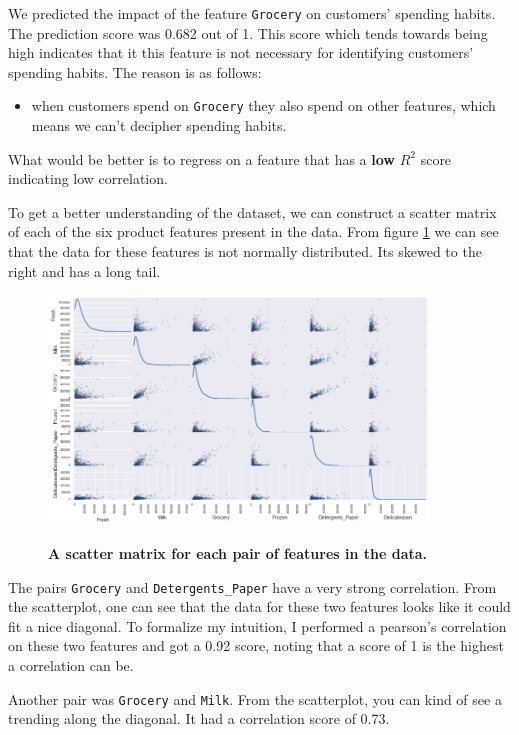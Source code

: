 \documentclass[twoside,openright,titlepage,numbers=noenddot,headinclude,%
               footinclude=true,cleardoublepage=empty,abstractoff,BCOR=5mm,%
               paper=a4,fontsize=11pt,ngerman,american]{scrreprt}
\numberwithin{theorem}{chapter}
\numberwithin{definition}{chapter}
\numberwithin{algorithm}{chapter}
\numberwithin{figure}{chapter}
\numberwithin{table}{chapter}
\numberwithin{equation}{chapter}
\begin{document}
We predicted the impact of the feature \texttt{Grocery} on customers' spending habits. The prediction score was 0.682 out of 1. This score which tends towards being high indicates that it this feature is not necessary for identifying customers' spending habits. The reason is as follows: 
\begin {itemize}
\item when customers spend on \texttt{Grocery} they also spend on other features, which means we can't decipher spending habits. 
\end{itemize}
What would be better is to regress on a feature that has a \textbf{low} $R^2$ score indicating low correlation.


To get a better understanding of the dataset, we can construct a scatter matrix of each of the six product features present in the data. From figure \ref{scatterplot} we can see that the data for these features is not normally distributed. Its skewed to the right and has a long tail.
\begin{figure}[!hbtp]
\centering
   
    \includegraphics[width=0.9\textwidth]{figures/scatterplot}
    \label{scatterplot}
    
    \caption{\textbf{A scatter matrix for each pair of features in the data. }}
\end{figure}

The pairs \texttt{Grocery} and \texttt{Detergents\_Paper} have a very strong correlation. From the scatterplot, one can see that the data for these two features looks like it could fit a nice diagonal. To formalize my intuition, I performed a pearson's correlation on these two features and got a 0.92 score, noting that a score of 1 is the highest a correlation can be.

Another pair was \texttt{Grocery} and \texttt{Milk}. From the scatterplot, you can kind of see a trending along the diagonal. It had a correlation score of 0.73.
\end{document}
